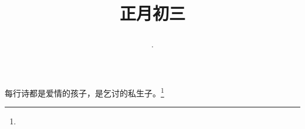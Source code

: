 \title{\date[d=12,m=2,y=2024][year:cn-y,年,month:cn,day:cn,日,·,weekday]·正月初三 }
每行诗都是爱情的孩子，是乞讨的私生子。\footnote{ }

